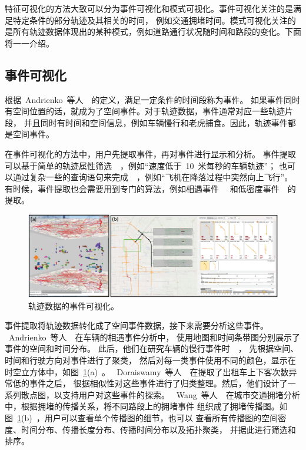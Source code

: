 \documentclass[12pt,twocolumn]{article}
\begin{document}
特征可视化的方法大致可以分为事件可视化和模式可视化。事件可视化关注的是满足特定条件的部分轨迹及其相关的时间，
例如交通拥堵时间。模式可视化关注的是所有轨迹数据体现出的某种模式，例如道路通行状况随时间和路段的变化。下面将一一介绍。

\subsection{事件可视化}
\label{subsection:extraction_event}

根据~Andrienko~等人~\citep{AndrienkoAH2011}~的定义，满足一定条件的时间段称为事件。
如果事件同时有空间位置的话，就成为了空间事件。对于轨迹数据，事件通常对应一些轨迹片段，
并且同时有时间和空间信息，例如车辆慢行和老虎捕食。因此，轨迹事件都是空间事件。

在事件可视化的方法中，用户先提取事件，再对事件进行显示和分析。
事件提取可以基于简单的轨迹属性筛选~\citep{AndrienkoAHRW2013}~，例如“速度低于~10~米每秒的车辆轨迹”；
也可以通过复杂一些的查询语句来完成~\citep{SakrABAGH2011}~，例如“飞机在降落过程中突然向上飞行”。
有时候，事件提取也会需要用到专门的算法，例如相遇事件~\citep{BakMHYS2012}~
和低密度事件~\citep{DoraiswamyFDFS2014}~的提取。

\begin{figure}[!htb]
\centering
\includegraphics[width=0.85\linewidth]{images/extraction_event.eps}
\caption{\label{fig:extraction_event}轨迹数据的事件可视化。
}
\end{figure}

事件提取将轨迹数据转化成了空间事件数据，接下来需要分析这些事件。
~Andrienko~等人~\citep{AndrienkoAWO2008}~在车辆的相遇事件分析中，
使用地图和时间条带图分别展示了事件的空间和时间分布。
此后，他们在研究车辆的慢行事件时~\citep{AndrienkoAHRW2013}~，
先根据空间、时间和行驶方向对事件进行了聚类，
然后对每一类事件使用不同的颜色，显示在时空立方体中，如图~\ref{fig:extraction_event}(a)~。
~Doraiswamy~等人~\citep{DoraiswamyFDFS2014}~在提取了出租车上下客次数异常低的事件之后，
很据相似性对这些事件进行了归类整理。然后，他们设计了一系列散点图，以支持用户对这些事件的探索。
~Wang~等人~\citep{WangLYZW2013}~在城市交通拥堵分析中，根据拥堵的传播关系，将不同路段上的拥堵事件
组织成了拥堵传播图。如图~\ref{fig:extraction_event}(b)~，用户可以查看单个传播图的细节，也可以
查看所有传播图的空间密度、时间分布、传播长度分布、传播时间分布以及拓扑聚类，
并据此进行筛选和排序。
\end{document}
